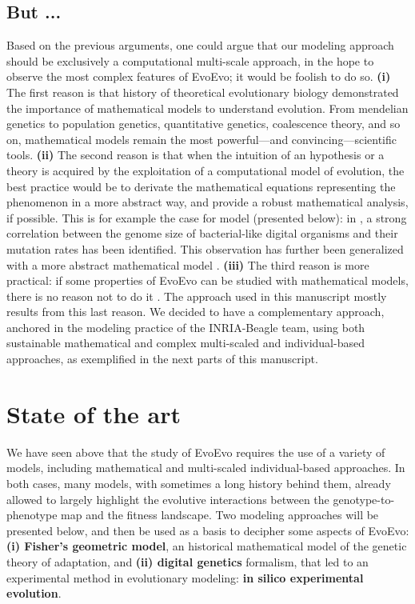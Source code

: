 \subsection{But ...}
Based on the previous arguments, one could argue that our modeling approach should be exclusively a computational multi-scale approach, in the hope to observe the most complex features of EvoEvo; it would be foolish to do so. \textbf{(i)} The first reason is that history of theoretical evolutionary biology demonstrated the importance of mathematical models to understand evolution. From mendelian genetics to population genetics, quantitative genetics, coalescence theory, and so on, mathematical models remain the most powerful---and convincing---scientific tools. \textbf{(ii)} The second reason is that when the intuition of an hypothesis or a theory is acquired by the exploitation of a computational model of evolution, the best practice would be to derivate the mathematical equations representing the phenomenon in a more abstract way, and provide a robust mathematical analysis, if possible. This is for example the case for {\aevol} model \citep{knibbe-et-al-2007a} (presented below): in {\aevol}, a strong correlation between the genome size of bacterial-like digital organisms and their mutation rates has been identified. This observation has further been generalized with a more abstract mathematical model \citep{fischer-et-al-2014}.
\textbf{(iii)} The third reason is more practical: if some properties of EvoEvo can be studied with mathematical models, there is no reason not to do it \citep{peck-2004}. The approach used in this manuscript mostly results from this last reason. We decided to have a complementary approach, anchored in the modeling practice of the INRIA-Beagle team, using both sustainable mathematical and complex multi-scaled and individual-based approaches, as exemplified in the next parts of this manuscript.

\section{State of the art}
\label{sec:general_introduction:introduction:state_of_the_art}

We have seen above that the study of EvoEvo requires the use of a variety of models, including mathematical and multi-scaled individual-based approaches. In both cases, many models, with sometimes a long history behind them, already allowed to largely highlight the evolutive interactions between the genotype-to-phenotype map and the fitness landscape. Two modeling approaches will be presented below, and then be used as a basis to decipher some aspects of EvoEvo: \textbf{(i) Fisher's geometric model}, an historical mathematical model of the genetic theory of adaptation, and \textbf{(ii) digital genetics} formalism, that led to an experimental method in evolutionary modeling: \textbf{in silico experimental evolution}.

